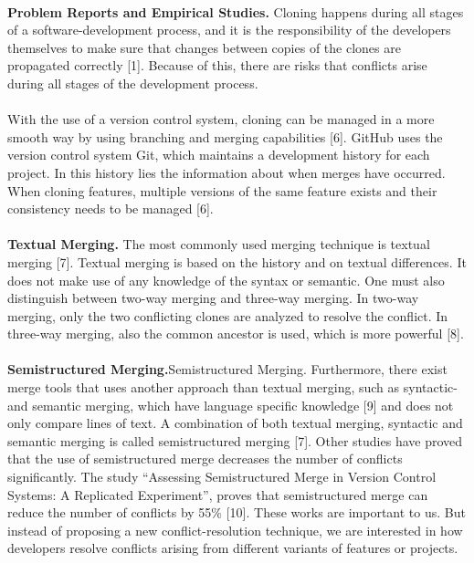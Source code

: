 \paragraph*{}
\textbf{Problem Reports and Empirical Studies.} Cloning happens during all stages of a software-development process, and it is the responsibility of the developers themselves to make sure that changes between copies of the clones are propagated correctly [1]. Because of this, there are risks that conflicts arise during all stages of the development process.

\paragraph*{}
With the use of a version control system, cloning can be managed in a more smooth way by using branching and merging capabilities [6]. GitHub uses the version control system Git, which maintains a development history for each project. In this history lies the information about when merges have occurred. When cloning features, multiple versions of the same feature exists and their consistency needs to be managed [6].

\paragraph*{}
\textbf{Textual Merging.} The most commonly used merging technique is textual merging [7]. Textual merging is based on the history and on textual differences. It does not make use of any knowledge of the syntax or semantic. One must also distinguish between two-way merging and three-way merging. In two-way merging, only the two conflicting clones are analyzed to resolve the conflict. In three-way merging, also the common ancestor is used, which is more powerful [8].

\paragraph*{}
\textbf{Semistructured Merging.}Semistructured Merging. Furthermore, there exist merge tools that uses another approach than textual merging, such as syntactic- and semantic merging, which have language specific knowledge [9] and does not only compare lines of text. A combination of both textual merging, syntactic and semantic merging is called semistructured merging [7]. Other studies have proved that the use of semistructured merge decreases the number of conflicts significantly. The study “Assessing Semistructured Merge in Version Control Systems: A Replicated Experiment”, proves that semistructured merge can reduce the number of conflicts by 55\% [10]. These works are important to us. But instead of proposing a new conflict-resolution technique, we are interested in how developers resolve conflicts arising from different variants of features or projects.

